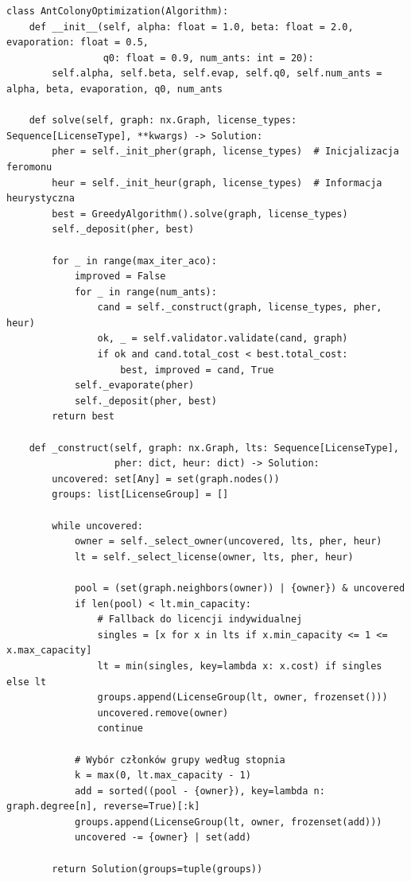     {\footnotesize
        \begin{verbatim}
class AntColonyOptimization(Algorithm):
    def __init__(self, alpha: float = 1.0, beta: float = 2.0, evaporation: float = 0.5,
                 q0: float = 0.9, num_ants: int = 20):
        self.alpha, self.beta, self.evap, self.q0, self.num_ants = alpha, beta, evaporation, q0, num_ants

    def solve(self, graph: nx.Graph, license_types: Sequence[LicenseType], **kwargs) -> Solution:
        pher = self._init_pher(graph, license_types)  # Inicjalizacja feromonu
        heur = self._init_heur(graph, license_types)  # Informacja heurystyczna
        best = GreedyAlgorithm().solve(graph, license_types)
        self._deposit(pher, best)

        for _ in range(max_iter_aco):
            improved = False
            for _ in range(num_ants):
                cand = self._construct(graph, license_types, pher, heur)
                ok, _ = self.validator.validate(cand, graph)
                if ok and cand.total_cost < best.total_cost:
                    best, improved = cand, True
            self._evaporate(pher)
            self._deposit(pher, best)
        return best

    def _construct(self, graph: nx.Graph, lts: Sequence[LicenseType],
                   pher: dict, heur: dict) -> Solution:
        uncovered: set[Any] = set(graph.nodes())
        groups: list[LicenseGroup] = []

        while uncovered:
            owner = self._select_owner(uncovered, lts, pher, heur)
            lt = self._select_license(owner, lts, pher, heur)

            pool = (set(graph.neighbors(owner)) | {owner}) & uncovered
            if len(pool) < lt.min_capacity:
                # Fallback do licencji indywidualnej
                singles = [x for x in lts if x.min_capacity <= 1 <= x.max_capacity]
                lt = min(singles, key=lambda x: x.cost) if singles else lt
                groups.append(LicenseGroup(lt, owner, frozenset()))
                uncovered.remove(owner)
                continue

            # Wybór członków grupy według stopnia
            k = max(0, lt.max_capacity - 1)
            add = sorted((pool - {owner}), key=lambda n: graph.degree[n], reverse=True)[:k]
            groups.append(LicenseGroup(lt, owner, frozenset(add)))
            uncovered -= {owner} | set(add)

        return Solution(groups=tuple(groups))


\end{verbatim}}
